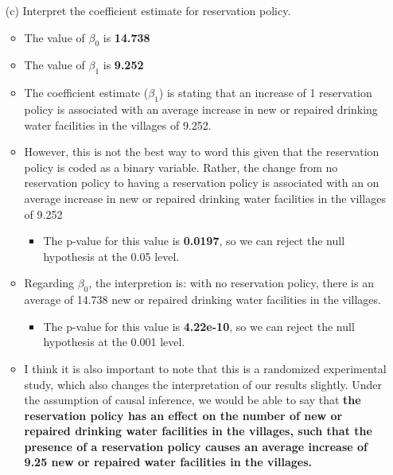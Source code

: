 \documentclass[12pt,letterpaper]{article}
\begin{document}
\begin{enumerate}
			
	\vspace{0cm}
	\item [(c)] Interpret the coefficient estimate for reservation policy. 
		\begin{itemize}
			\item The value of $\beta_0$ is \textbf{14.738}
			\item The value of $\beta_1$ is \textbf{9.252}
			\item The coefficient estimate ($\beta_1$) is stating that an increase of 1 reservation policy is associated with an average increase in new or repaired drinking water facilities in the villages of 9.252. 
			\item However, this is not the best way to word this given that the reservation policy is coded as a binary variable. Rather, the change from no reservation policy to having a reservation policy is associated with an on average increase in new or repaired drinking water facilities in the villages of 9.252
				\begin{itemize}
					\item The p-value for this value is \textbf{0.0197}, so we can reject the null hypothesis at the 0.05 level.
				\end{itemize}
			\item Regarding $\beta_0$, the interpretion is: with no reservation policy, there is an average of 14.738 new or repaired drinking water facilities in the villages.
				\begin{itemize}
					\item The p-value for this value is \textbf{4.22e-10}, so we can reject the null hypothesis at the 0.001 level.
				\end{itemize}
			\item I think it is also important to note that this is a randomized experimental study, which also changes the interpretation of our results slightly. Under the assumption of causal inference, we would be able to say that \textbf{the reservation policy has an effect on the number of new or repaired drinking water facilities in the villages, such that the presence of a reservation policy causes an average increase of 9.25 new or repaired water facilities in the villages.}
			
		\end{itemize}
\end{enumerate}
\end{document}
